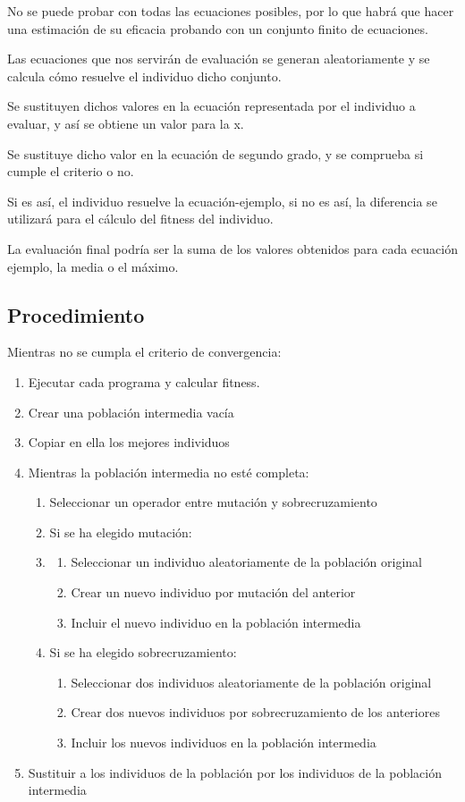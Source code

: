 \documentclass[12pt, twoside, openright]{report} %
\begin{document}
No se puede probar con todas las ecuaciones posibles, por lo que habrá que hacer una estimación de su eficacia probando con un conjunto finito de ecuaciones.

Las ecuaciones que nos servirán de evaluación se generan aleatoriamente y se calcula cómo resuelve el individuo dicho conjunto.

Se sustituyen dichos valores en la ecuación representada por el individuo a evaluar, y así se obtiene un valor para la x.

Se sustituye dicho valor en la ecuación de segundo grado, y se comprueba si cumple el criterio o no.

Si es así, el individuo resuelve la ecuación-ejemplo, si no es así, la diferencia se utilizará para el cálculo del ﬁtness del individuo.

La evaluación final podría ser la suma de los valores obtenidos para cada ecuación ejemplo, la media o el máximo.

\subsection{Procedimiento}
Mientras no se cumpla el criterio de convergencia:
\begin{enumerate}
	\item Ejecutar cada programa y calcular fitness.
	\item Crear una población intermedia vacía
	\item Copiar en ella los mejores individuos
	\item Mientras la población intermedia no esté completa:
	\begin{enumerate}
		\item Seleccionar un operador entre mutación y sobrecruzamiento
		\item Si se ha elegido mutación:
		\item \begin{enumerate}
			\item Seleccionar un individuo aleatoriamente de la población
			original
			\item Crear un nuevo individuo por mutación del anterior
			\item Incluir el nuevo individuo en la población intermedia
		\end{enumerate}
		\item Si se ha elegido sobrecruzamiento:
		\begin{enumerate}
			\item Seleccionar dos individuos aleatoriamente de la población original
			\item Crear dos nuevos individuos por sobrecruzamiento de los
			anteriores
			\item Incluir los nuevos individuos en la población intermedia
		\end{enumerate}
	\end{enumerate}
	
	\item Sustituir a los individuos de la población por los individuos de
	la población intermedia
\end{enumerate}
\end{document}
